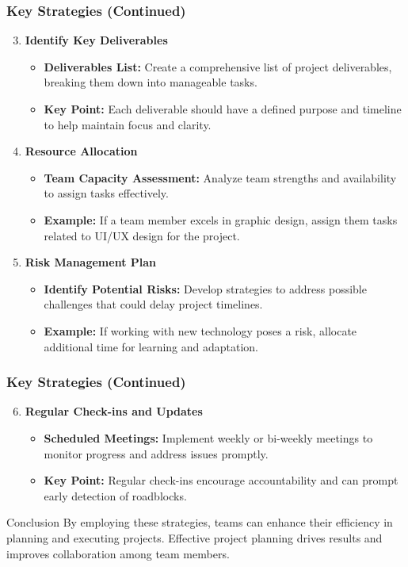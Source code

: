 \documentclass[aspectratio=169]{beamer}
\begin{document}
\begin{frame}[fragile]
    \frametitle{Key Strategies (Continued)}
    \begin{enumerate}
        \setcounter{enumi}{2}
        \item \textbf{Identify Key Deliverables}
        \begin{itemize}
            \item \textbf{Deliverables List:} Create a comprehensive list of project deliverables, breaking them down into manageable tasks.
            \item \textbf{Key Point:} Each deliverable should have a defined purpose and timeline to help maintain focus and clarity.
        \end{itemize}
        
        \item \textbf{Resource Allocation}
        \begin{itemize}
            \item \textbf{Team Capacity Assessment:} Analyze team strengths and availability to assign tasks effectively.
            \item \textbf{Example:} If a team member excels in graphic design, assign them tasks related to UI/UX design for the project.
        \end{itemize}

        \item \textbf{Risk Management Plan}
        \begin{itemize}
            \item \textbf{Identify Potential Risks:} Develop strategies to address possible challenges that could delay project timelines.
            \item \textbf{Example:} If working with new technology poses a risk, allocate additional time for learning and adaptation.
        \end{itemize}
    \end{enumerate}
\end{frame}

\begin{frame}[fragile]
    \frametitle{Key Strategies (Continued)}
    \begin{enumerate}
        \setcounter{enumi}{5}
        \item \textbf{Regular Check-ins and Updates}
        \begin{itemize}
            \item \textbf{Scheduled Meetings:} Implement weekly or bi-weekly meetings to monitor progress and address issues promptly.
            \item \textbf{Key Point:} Regular check-ins encourage accountability and can prompt early detection of roadblocks.
        \end{itemize}
    \end{enumerate}
    \begin{block}{Conclusion}
        By employing these strategies, teams can enhance their efficiency in planning and executing projects. Effective project planning drives results and improves collaboration among team members.
    \end{block}
\end{frame}
\end{document}
